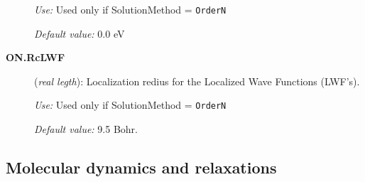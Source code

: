 \begin{description}
{\it Use:} Used only if SolutionMethod = {\tt OrderN}

{\it Default value:} 0.0 eV

\item[{\bf ON.RcLWF}] ({\it real legth}): Localization redius for the
Localized Wave Functions (LWF's).

{\it Use:} Used only if SolutionMethod = {\tt OrderN}

{\it Default value:} 9.5 Bohr.
        
\end{description}



\vspace{5pt}
\subsection{Molecular dynamics and relaxations}


